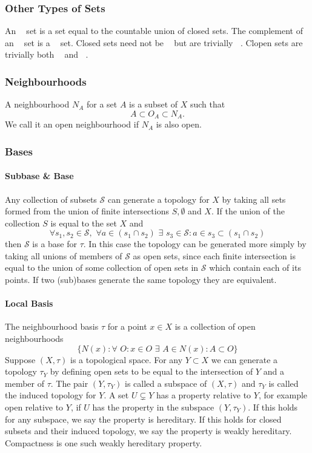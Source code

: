 \documentclass{article}
\DeclareMathOperator\Fs{F_{\sigma}}
\DeclareMathOperator\Gd{G_{\delta}}
\begin{document}
\subsubsection{Other Types of Sets}
An $\Fs$ set is a set equal to the countable union of closed sets. The complement of an $\Fs$ set is a
$\Gd$ set. Closed sets need not be $\Gd$ but are trivially $\Fs$.
Clopen sets are trivially both $\Gd$ and $\Fs$.
\subsubsection{Neighbourhoods}
A neighbourhood $N_A$ for a set $A$ is a subset of $X$ such that $$
A \subset O_A \subset N_A.
$$
We call it an open neighbourhood if $N_A$ is also open.
\subsubsection{Bases}
\paragraph{Subbase \& Base}
Any collection of subsets $\mathcal{S}$ can generate a topology for $X$ by taking all
sets formed from the union of finite intersections $S, \emptyset$ and $X$. If the union of the collection $S$ is equal to
the set $X$ and $$\forall s_1,s_2 \in \mathcal{S}, \,\, \forall a \in (s_1 \cap s_2)  \,\, \exists \,\,s_3 \in \mathcal{S}:a \in s_3 \subset (s_1 \cap s_2)$$
then $\mathcal{S}$ is a base for $\tau$. In this case
the topology can be generated more simply by taking all unions of members of
$\mathcal{S}$ as open sets, since each finite intersection
is equal to the union of some collection of open sets in $\mathcal{S}$
which contain each of its points. If two (sub)bases generate the same topology
they are equivalent.
\paragraph{Local Basis}
The neighbourhood basis $\tau$ for a point $x \in X$ is a collection of open neighbourhoods
$$ \{ N(x):\forall \,\,O: x \in O \,\, \exists \,\, A \in N(x) : A \subset O \}$$
%
%
Suppose $(X,\tau)$ is a topological space.
For any $Y \subset X$ we can generate a topology $\tau_Y$ by
 defining open sets to be equal
to the intersection of $Y$ and a member of $\tau$. The pair $(Y,\tau_Y)$ is called a
subspace of $(X,\tau)$ and $\tau_Y$ is called the induced topology for $Y$. A set $U \subsetneq Y$
has a property relative to $Y$, for example open relative to $Y$, if $U$ has the property in the subspace $(Y,\tau_Y)$.
If this holds for any subspace, we say the property is hereditary. If this holds
for closed subsets and their induced topology,
we say the property is weakly hereditary. Compactness is one such weakly hereditary property.
\end{document}
